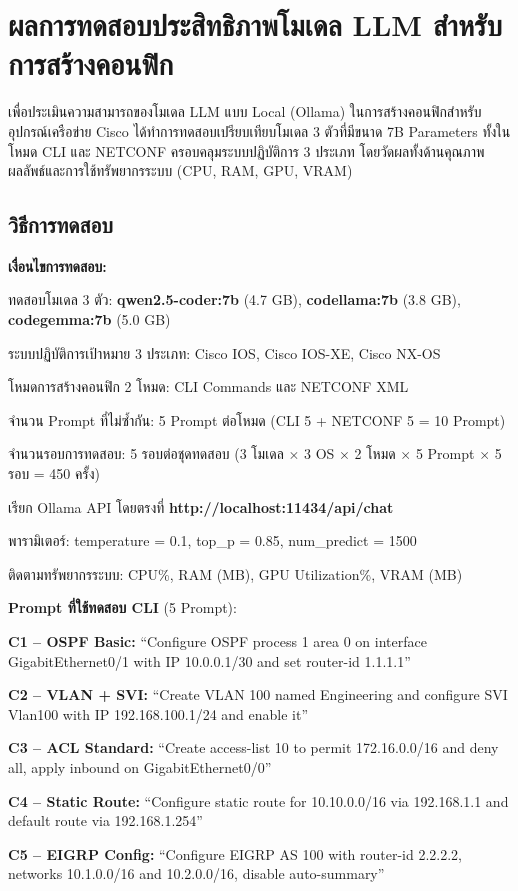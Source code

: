 \section{ผลการทดสอบประสิทธิภาพโมเดล LLM สำหรับการสร้างคอนฟิก}
\hspace*{1.3em}
เพื่อประเมินความสามารถของโมเดล LLM แบบ Local (Ollama) ในการสร้างคอนฟิกสำหรับอุปกรณ์เครือข่าย Cisco ได้ทำการทดสอบเปรียบเทียบโมเดล 3 ตัวที่มีขนาด 7B Parameters ทั้งในโหมด CLI และ NETCONF ครอบคลุมระบบปฏิบัติการ 3 ประเภท โดยวัดผลทั้งด้านคุณภาพผลลัพธ์และการใช้ทรัพยากรระบบ (CPU, RAM, GPU, VRAM)

\subsection{วิธีการทดสอบ}
\hspace*{1.3em}
\textbf{เงื่อนไขการทดสอบ:}
\begin{mycustomitem2}
    \item ทดสอบโมเดล 3 ตัว: \textbf{qwen2.5-coder:7b} (4.7 GB), \textbf{codellama:7b} (3.8 GB), \textbf{codegemma:7b} (5.0 GB)
    \item ระบบปฏิบัติการเป้าหมาย 3 ประเภท: Cisco IOS, Cisco IOS-XE, Cisco NX-OS
    \item โหมดการสร้างคอนฟิก 2 โหมด: CLI Commands และ NETCONF XML
    \item จำนวน Prompt ที่ไม่ซ้ำกัน: 5 Prompt ต่อโหมด (CLI 5 + NETCONF 5 = 10 Prompt)
    \item จำนวนรอบการทดสอบ: 5 รอบต่อชุดทดสอบ (3 โมเดล $\times$ 3 OS $\times$ 2 โหมด $\times$ 5 Prompt $\times$ 5 รอบ = 450 ครั้ง)
    \item เรียก Ollama API โดยตรงที่ \textbf{http://localhost:11434/api/chat}
    \item พารามิเตอร์: temperature = 0.1, top\_p = 0.85, num\_predict = 1500
    \item ติดตามทรัพยากรระบบ: CPU\%, RAM (MB), GPU Utilization\%, VRAM (MB)
\end{mycustomitem2}

\hspace*{1.3em}
\textbf{Prompt ที่ใช้ทดสอบ CLI} (5 Prompt):
\begin{mycustomitem2}
    \item \textbf{C1 -- OSPF Basic:} ``Configure OSPF process 1 area 0 on interface GigabitEthernet0/1 with IP 10.0.0.1/30 and set router-id 1.1.1.1''
    \item \textbf{C2 -- VLAN + SVI:} ``Create VLAN 100 named Engineering and configure SVI Vlan100 with IP 192.168.100.1/24 and enable it''
    \item \textbf{C3 -- ACL Standard:} ``Create access-list 10 to permit 172.16.0.0/16 and deny all, apply inbound on GigabitEthernet0/0''
    \item \textbf{C4 -- Static Route:} ``Configure static route for 10.10.0.0/16 via 192.168.1.1 and default route via 192.168.1.254''
    \item \textbf{C5 -- EIGRP Config:} ``Configure EIGRP AS 100 with router-id 2.2.2.2, networks 10.1.0.0/16 and 10.2.0.0/16, disable auto-summary''
\end{mycustomitem2}

